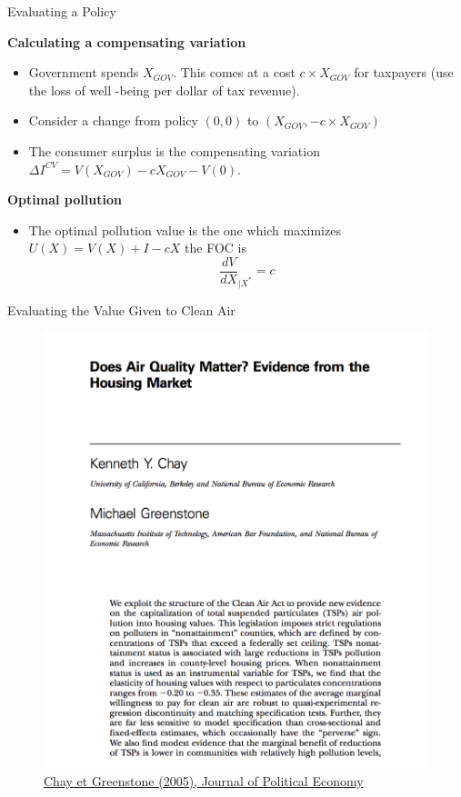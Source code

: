 \documentclass[handout]{beamer}
\newenvironment{iPar}[1]{\textbf{#1} \begin{itemize}}{\end{itemize}}
\newcommand{\mdp}{\medskip \pause}
\begin{document}
\begin{frame}{Evaluating a Policy}

\begin{iPar}{Calculating a compensating variation}
\item Government spends $X_{GOV}$. This comes at a cost $c\times X_{GOV}$ for taxpayers (use the loss of well -being per dollar of tax revenue).
\item Consider a change from policy   $(0,0)$ to  $(X_{GOV}, - c \times X_{GOV})$
\item The consumer surplus is the compensating variation $\Delta I^{CV} =  V(X_{GOV}) - c X_{GOV} - V(0)$.
\end{iPar}\mdp

\begin{iPar}{Optimal pollution}
\item The optimal pollution value is the one which maximizes $U(X) = V(X) + I - c X$  \mdp
the FOC is
$$\frac{dV}{d X}_{|X^*} = c$$
\end{iPar}

\end{frame}



\begin{frame}{Evaluating the Value Given to Clean Air}
\begin{figure}
\includegraphics[scale=0.3]{chay.png}
\caption{\href{https://www.jstor.org/stable/10.1086/427462}{Chay et Greenstone (2005), Journal of Political Economy}}
\end{figure}
\end{frame}
\end{document}

